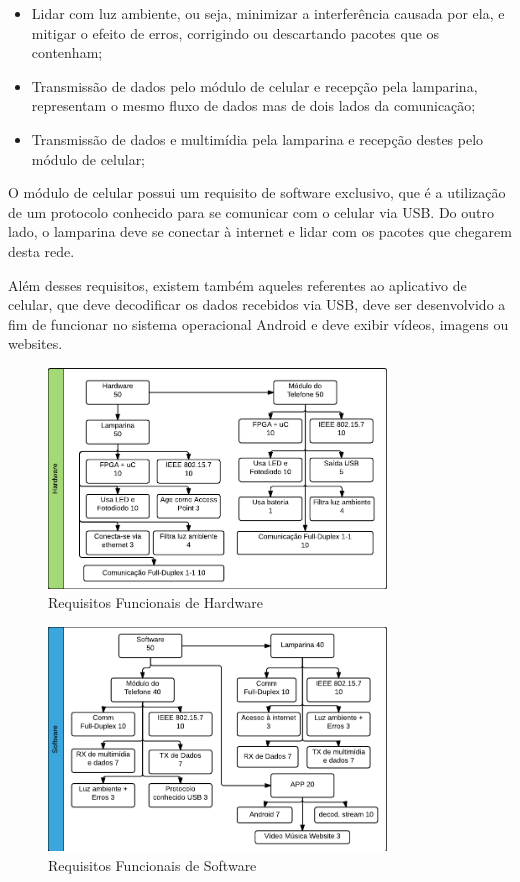 	\begin{itemize}  
		\item Lidar com luz ambiente, ou seja, minimizar a interferência causada por ela, e mitigar o efeito de erros, corrigindo ou descartando pacotes que os contenham;
		\item Transmissão de dados pelo módulo de celular e recepção pela lamparina, representam o mesmo fluxo de dados mas de dois lados da comunicação;
		\item Transmissão de dados e multimídia pela lamparina e recepção destes pelo módulo de celular;
	\end{itemize}
	
	O módulo de celular possui um requisito de software exclusivo, que é a utilização de um protocolo conhecido para se comunicar com o celular via USB. Do outro lado, o lamparina deve se conectar à internet e lidar com os pacotes que chegarem desta rede. 
	
	Além desses requisitos, existem também aqueles referentes ao aplicativo de celular, que deve decodificar os dados recebidos via USB, deve ser desenvolvido a fim de funcionar no sistema operacional Android e deve exibir vídeos, imagens ou websites.

	\begin{figure}[h!]
		\caption{\label{fig_req1_1} Requisitos Funcionais de Hardware}
		\centering
		\includegraphics[width=0.8\textwidth]{ReqTree1_1.pdf}
	\end{figure}

	\begin{figure}[h!]
		\caption{\label{fig_req1_2} Requisitos Funcionais de Software}
		\centering
		\includegraphics[width=0.8\textwidth]{ReqTree1_2.pdf}
	\end{figure}
	
